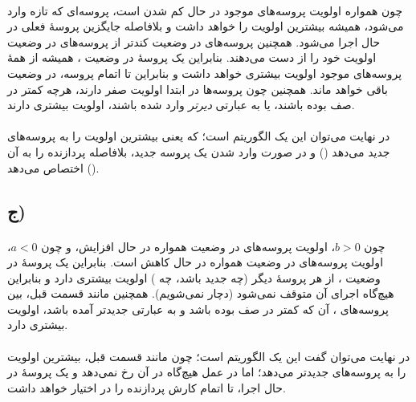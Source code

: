 \documentclass{article}
\begin{document}
	\paragraph*{}
	چون همواره اولویت پروسه‌های موجود در حال کم شدن است، پروسه‌ای که تازه وارد می‌شود، همیشه بیشترین اولویت را خواهد داشت و بلافاصله جایگزین پروسهٔ فعلی در حال اجرا می‌شود. همچنین پروسه‌های در وضعیت
	کندتر از پروسه‌های در وضعیت
	اولویت خود را از دست می‌دهند. بنابراین یک پروسهٔ در وضعیت
	،
	همیشه از همهٔ پروسه‌های
	موجود اولویت بیشتری خواهد داشت و بنابراین تا اتمام پروسه، در وضعیت
	باقی خواهد ماند. همچنین چون پروسه‌ها در ابتدا اولویت صفر دارند، هرچه کمتر در صف
	بوده باشند، یا به عبارتی
	\textit{دیرتر}
	وارد شده باشند، اولویت بیشتری دارند.

	\paragraph*{}
	در نهایت می‌توان این یک الگوریتم
	است؛ که یعنی بیشترین اولویت را به پروسه‌های جدید می‌دهد
	()
	و در صورت وارد شدن یک پروسه جدید، بلافاصله پردازنده را به آن اختصاص می‌دهد
	().

	\subsection*{ج)}
	\paragraph*{}
	چون
	$b > 0$،
	اولویت پروسه‌های در وضعیت
	همواره در حال افزایش، و چون
	$a < 0$،
	اولویت پروسه‌های در وضعیت
	همواره در حال کاهش است. بنابراین یک پروسهٔ در وضعیت
	،
	از هر پروسهٔ دیگر (چه جدید باشد، چه
	)
	اولویت بیشتری دارد و بنابراین هیچ‌گاه اجرای آن متوقف نمی‌شود (دچار
	نمی‌شویم).
	همچنین مانند قسمت قبل، بین پروسه‌های
	،
	آن که کمتر در صف بوده باشد و به عبارتی جدیدتر آمده باشد، اولویت بیشتری دارد.

	\paragraph*{}
	در نهایت می‌توان گفت این یک الگوریتم
	است؛ چون مانند قسمت قبل، بیشترین اولویت را به پروسه‌های جدید‌تر می‌دهد؛ اما در عمل هیچ‌گاه
	در آن رخ نمی‌دهد و یک پروسهٔ در حال اجرا، تا اتمام کارش پردازنده را در اختیار خواهد داشت.
\end{document}
